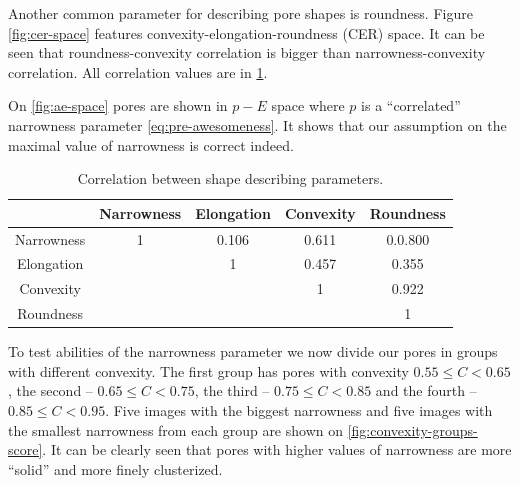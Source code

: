 \documentclass[reprint,amsmath,amssymb,aps,pre,showkeys,showpacs]{revtex4-1}
\begin{document}
Another common parameter for describing pore shapes is roundness. Figure
\ref{fig:cer-space} features convexity-elongation-roundness (CER) space. It can
be seen that roundness-convexity correlation is bigger than narrowness-convexity
correlation. All correlation values are in \cref{tab:correlations}.

On \cref{fig:ae-space} pores are shown in $p-E$ space where $p$ is a
``correlated'' narrowness parameter \cref{eq:pre-awesomeness}. It shows that our
assumption on the maximal value of narrowness is correct indeed.

\begin{table}[!htp]
  \centering
  \begin{tabular}{|c|c|c|c|c|}
    \hline
    & Narrowness & Elongation & Convexity & Roundness \\
    \hline
    Narrowness & 1 & 0.106 & 0.611 & 0.0.800 \\
    \hline
    Elongation & & 1 & 0.457 & 0.355 \\
    \hline
    Convexity &&& 1 & 0.922 \\
    \hline
    Roundness &&&& 1 \\
    \hline
  \end{tabular}
  \caption{Correlation between shape describing parameters.}
  \label{tab:correlations}
\end{table}

To test abilities of the narrowness parameter we now divide our pores in groups
with different convexity. The first group has pores with convexity
$0.55 \le C < 0.65$, the second -- $0.65 \le C < 0.75$, the third --
$0.75 \le C < 0.85$ and the fourth -- $0.85 \le C < 0.95$. Five images with the
biggest narrowness and five images with the smallest narrowness from each group
are shown on \cref{fig:convexity-groups-score}. It can be clearly seen that
pores with higher values of narrowness are more ``solid'' and more finely
clusterized.
\end{document}
